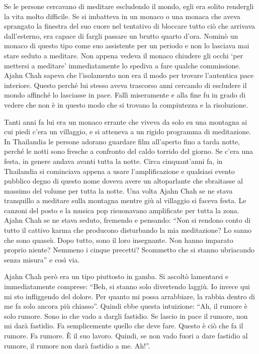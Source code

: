 Se le persone cercavano di meditare escludendo il mondo, egli era solito rendergli la vita molto difficile. Se si imbatteva in un monaco o una monaca che aveva sprangato la finestra del suo cuore nel tentativo di bloccare tutto ciò che arrivava dall'esterno, era capace di fargli passare un brutto quarto d'ora. Nominò un monaco di questo tipo come suo assistente per un periodo e non lo lasciava mai stare seduto a meditare. Non appena vedeva il monaco chiudere gli occhi `per mettersi a meditare' immediatamente lo spediva a fare qualche commissione. Ajahn Chah sapeva che l'isolamento non era il modo per trovare l'autentica pace interiore. Questo perché lui stesso aveva trascorso anni cercando di escludere il mondo affinché lo lasciasse in pace. Fallì miseramente e alla fine fu in grado di vedere che non è in questo modo che si trovano la compiutezza e la risoluzione. 

Tanti anni fa lui era un monaco errante che viveva da solo su una montagna ai cui piedi c'era un villaggio, e si atteneva a un rigido programma di meditazione. In Thailandia le persone adorano guardare film all'aperto fino a tarda notte, perché le notti sono fresche a confronto del caldo torrido del giorno. Se c'era una festa, in genere andava avanti tutta la notte. Circa cinquant'anni fa, in Thailandia si cominciava appena a usare l'amplificazione e qualsiasi evento pubblico degno di questo nome doveva avere un altoparlante che sbraitasse al massimo del volume per tutta la notte. Una volta Ajahn Chah se ne stava tranquillo a meditare sulla montagna mentre giù al villaggio si faceva festa. Le canzoni del posto e la musica pop risuonavano amplificate per tutta la zona. Ajahn Chah se ne stava seduto, fremendo e pensando: ``Non si rendono conto di tutto il cattivo karma che producono disturbando la mia meditazione? Lo sanno che sono quassù. Dopo tutto, sono il loro insegnante. Non hanno imparato proprio niente? Nemmeno i cinque precetti? Scommetto che si stanno ubriacando senza misura'' e così via.

Ajahn Chah però era un tipo piuttosto in gamba. Si ascoltò lamentarsi e immediatamente comprese: ``Beh, si stanno solo divertendo laggiù. Io invece qui mi sto infliggendo del dolore. Per quanto mi possa arrabbiare, la rabbia dentro di me fa solo ancora più chiasso''. Quindi ebbe questa intuizione: ``Ah, il rumore è solo rumore. Sono io che vado a dargli fastidio. Se lascio in pace il rumore, non mi darà fastidio. Fa semplicemente quello che deve fare. Questo è ciò che fa il rumore. Fa rumore. È il suo lavoro. Quindi, se non vado fuori a dare fastidio al rumore, il rumore non darà fastidio a me. Ah!''.

